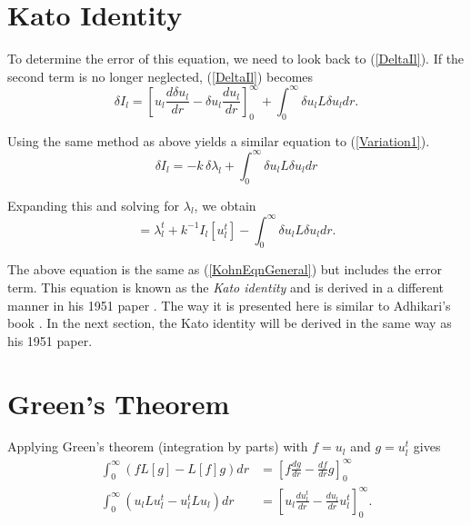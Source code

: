 \documentclass[Dissertation.tex]{subfiles}
\begin{document}
\section{Kato Identity}
To determine the error of this equation, we need to look back to (\ref{DeltaIl}).  If the second term is no longer neglected, (\ref{DeltaIl}) becomes
\begin{equation}
\delta I_l = \left[u_l \frac{d\delta u_l}{dr} - \delta u_l \frac{du_l}{dr} \right]_0^\infty + \int_0^\infty \delta u_l L \delta u_l dr.
\end{equation}

\noindent Using the same method as above yields a similar equation to (\ref{Variation1}).
\begin{equation}
\delta I_l = -k\, \delta\!\lambda_l + \int_0^\infty \delta u_l L \delta u_l dr
\end{equation}

\noindent Expanding this and solving for $\lambda_l$, we obtain
\begin{equation}
[\lambda_l] = \lambda_l^t + k^{-1} I_l[u_l^t] - \int_0^\infty \delta u_l L \delta u_l dr.
\label{Kato1}
\end{equation}

The above equation is the same as (\ref{KohnEqnGeneral}) but includes the error term.  This equation is known as the \emph{Kato identity} and is derived in a different manner in his 1951 paper \cite{Kato1951a}.  The way it is presented here is similar to Adhikari's book \cite{Adhikari}.  In the next section, the Kato identity will be derived in the same way as his 1951 paper.


\section{Green's Theorem}
Applying Green's theorem (integration by parts) with $f = u_l$ and $g = u_l^t$ gives \cite{Kato1951a}
\begin{align}
\nonumber \int_0^\infty(f L[g] - L[f] g)dr &= \left[f \frac{dg}{dr} - \frac{df}{dr} g\right]_0^\infty \\
\int_0^\infty(u_l L u_l^t - u_l^t L u_l)dr &= \left[u_l \frac{du_l^t}{dr} - \frac{du_l}{dr} u_l^t\right]_0^\infty.
\label{GreenTheorem}
\end{align}
\end{document}
